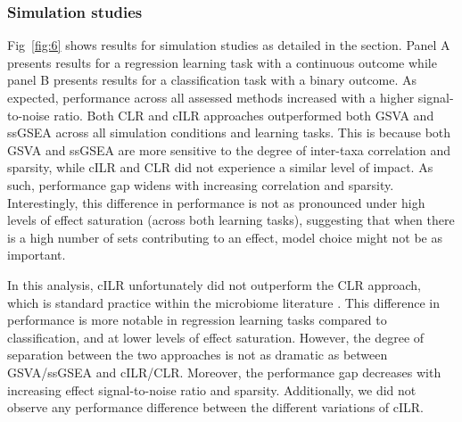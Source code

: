 \documentclass[10pt,letterpaper]{article}
\begin{document}
\subsubsection*{Simulation studies}
Fig~\ref{fig:6} shows results for simulation studies as detailed in the  section. Panel A presents results for a regression learning task with a continuous outcome while panel B presents results for a classification task with a binary outcome. As expected, performance across all assessed methods increased with a higher signal-to-noise ratio. Both CLR and cILR approaches outperformed both GSVA and ssGSEA across all simulation conditions and learning tasks. This is because both GSVA and ssGSEA are more sensitive to the degree of inter-taxa correlation and sparsity, while cILR and CLR did not experience a similar level of impact. As such, performance gap widens with increasing correlation and sparsity. Interestingly, this difference in performance is not as pronounced under high levels of effect saturation (across both learning tasks), suggesting that when there is a high number of sets contributing to an effect, model choice might not be as important.   

In this analysis, cILR unfortunately did not outperform the CLR approach, which is standard practice within the microbiome literature \cite{gloor2017}. This difference in performance is more notable in regression learning tasks compared to classification, and at lower levels of effect saturation. However, the degree of separation between the two approaches is not as dramatic as between GSVA/ssGSEA and cILR/CLR. Moreover, the performance gap decreases with increasing effect signal-to-noise ratio and sparsity. Additionally, we did not observe any performance difference between the different variations of cILR. 
\end{document}
